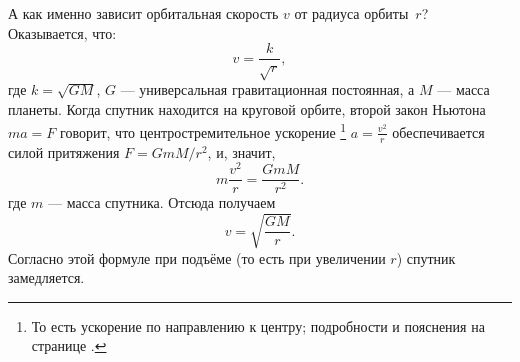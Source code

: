 А как именно зависит орбитальная скорость \(v\) от радиуса орбиты~\(r\)?
Оказывается, что:
\[
v = \frac{k}{\sqrt{r}},
\]
где \(k = \sqrt{GM}\),
\(G\) — универсальная гравитационная постоянная,
а \(M\) — масса планеты.
Когда спутник находится на круговой орбите, второй закон Ньютона \(ma = F\) говорит, что центростремительное ускорение%
\footnote{То есть ускорение по направлению к центру; подробности и пояснения на странице \pageref{Центростремительное ускорение}.}
$a = \frac{v^2}{r}$ обеспечивается силой притяжения $F = {GmM}/{r^2}$, и, значит,
\[
m \frac{v^2}{r} = \frac{GmM}{r^2}.
\]
где \(m\) — масса спутника.
Отсюда получаем
\[
v = \sqrt{\frac{GM}{r}}.
\]
Согласно этой формуле при подъёме (то есть при увеличении \(r\)) спутник замедляется.
